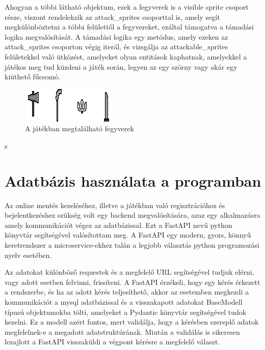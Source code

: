 Ahogyan a többi látható objektum, ezek a fegyverek is a visible sprite csoport része, viszont rendelekzik az attack\_sprites csoporttal is, amely segít megkülönböztetni a többi felülettől a fegyvereket, ezáltal támogatva a támadási logika megvalósítását. A támadási logika egy metódus, amely ezeken az attack\_sprites csoporton végig iterál, és vizsgálja az attackable\_sprites felületekkel való ütközést, amelyeket olyan entitások kaphatnak, amelyekkel a játékos meg tud küzdeni a játék során, legyen az egy szörny vagy akár egy kiüthető fűcsomó.  

\begin{figure}[H]
    \centering
    \includegraphics[width=15.5truecm]{images/weapons.png}
    \caption{A játékban megtalálható fegyverek \cite{weapons}}
    \label{fig:A játékban megtalálható fegyverek}
\end{figure}
s

\section{Adatbázis használata a programban}

\indent \indent Az online mentés kezeléséhez, illetve a játékban való regisztrációhoz és bejelentkezéshez szükség volt egy backend megvalósítására, azaz egy alkalmazásra amely kommunikációt végez az adatbázissal. Ezt a FastAPI nevű python könyvtár segítségével valósítottam meg. A FastAPI egy modern, gyors, könnyű keretrendszer a microservice-ekhez talán a legjobb választás python programozási nyelv esetében.

Az adatokat különböző requestek és a megfelelő URL segítségével tudjuk elérni, vagy adott esetben felvinni, frissíteni. A FastAPI érzékeli, hogy egy kérés érkezett a rendszerbe, és ha az adott kérés teljesíthető, akkor az esetemben megkezdi a kommunikációt a mysql adatbázissal és a visszakapott adatokat BaseModell típusú objektumokba tölti, amelyeket a Pydantic könyvtár segítségével tudok kezelni. Ez a modell azért fontos, mert validálja, hogy a kérésben szereplő adatok megfelelnek-e a megadott adatstruktúrának. Miután a validálás is sikeresen lezajlott a FastAPI visszaküldi a végpont kérésre a megfelelő választ.

